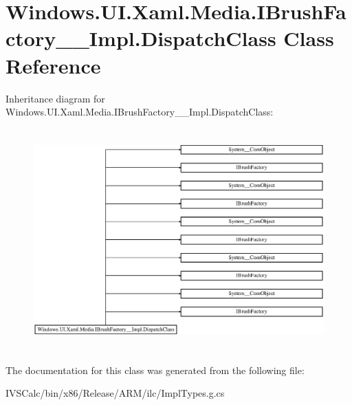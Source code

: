 \hypertarget{class_windows_1_1_u_i_1_1_xaml_1_1_media_1_1_i_brush_factory_____impl_1_1_dispatch_class}{}\section{Windows.\+U\+I.\+Xaml.\+Media.\+I\+Brush\+Factory\+\_\+\+\_\+\+Impl.\+Dispatch\+Class Class Reference}
\label{class_windows_1_1_u_i_1_1_xaml_1_1_media_1_1_i_brush_factory_____impl_1_1_dispatch_class}
Inheritance diagram for Windows.\+U\+I.\+Xaml.\+Media.\+I\+Brush\+Factory\+\_\+\+\_\+\+Impl.\+Dispatch\+Class\+:\begin{figure}[H]
\begin{center}
\leavevmode
\includegraphics[height=8.555555cm]{class_windows_1_1_u_i_1_1_xaml_1_1_media_1_1_i_brush_factory_____impl_1_1_dispatch_class}
\end{center}
\end{figure}


The documentation for this class was generated from the following file\+:\begin{DoxyCompactItemize}
\item 
I\+V\+S\+Calc/bin/x86/\+Release/\+A\+R\+M/ilc/Impl\+Types.\+g.\+cs\end{DoxyCompactItemize}
